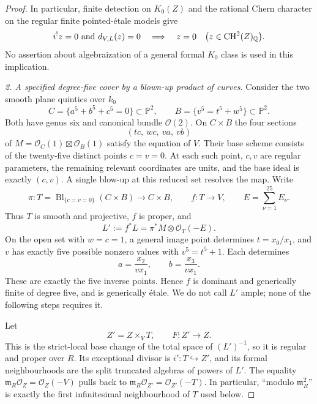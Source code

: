 \begin{proof}
In particular, finite detection on $K_0(Z)$ and the rational
Chern character on the regular finite pointed-\'etale models give
\begin{equation}\label{eq:C3au-detect}
 i^!z=0\ \hbox{and}\ d_{V,L}(z)=0
       \quad\Longrightarrow\quad z=0
           \quad\bigl(z\in\mathrm{CH}^2(Z)_{\mathbb Q}\bigr).
\end{equation}
No assertion about algebraization of a general formal $K_0$
class is used in this implication.

\emph{2. A specified degree-five cover by a blown-up product of curves.}
Consider the two smooth plane quintics over $k_0$
\[
 C=\{a^5+b^5+c^5=0\}\subset\mathbb P^2,
 \qquad
 B=\{v^5=t^5+w^5\}\subset\mathbb P^2.
\]
Both have genus six and canonical bundle $\mathcal O(2)$.
On $C\times B$ the four sections
\[
                  (tc,\ wc,\ va,\ vb)
\]
of $M=\mathcal O_C(1)\boxtimes\mathcal O_B(1)$ satisfy
the equation of $V$. Their base scheme consists of the twenty-five
distinct points $c=v=0$. At each such point, $c,v$ are regular
parameters, the remaining relevant coordinates are units, and the
base ideal is exactly $(c,v)$. A single blow-up at this reduced
set resolves the map. Write
\[
 \pi:T=\operatorname{Bl}_{\{c=v=0\}}(C\times B)\longrightarrow C\times B,
 \qquad f:T\longrightarrow V,
 \qquad E=\sum_{\nu=1}^{25}E_\nu.
\]
Thus $T$ is smooth and projective, $f$ is proper, and
\begin{equation}\label{eq:C3au-line}
             L':=f^*L=\pi^*M\otimes\mathcal O_T(-E).
\end{equation}
On the open set with $w=c=1$, a general image point determines
$t=x_0/x_1$, and $v$ has exactly five possible nonzero values
with $v^5=t^5+1$. Each determines
\[
                    a=\frac{x_2}{v x_1},\qquad
                    b=\frac{x_3}{v x_1}.
\]
These are exactly the five inverse points. Hence $f$ is dominant
and generically finite of degree five, and is generically \'etale.
We do not call $L'$ ample; none of the following steps requires it.

Let
\[
              Z'=Z\times_V T,\qquad F:Z'\longrightarrow Z.
\]
This is the strict-local base change of the total space of
$(L')^{-1}$, so it is regular and proper over $R$.
Its exceptional divisor is $i':T\hookrightarrow Z'$, and its
formal neighbourhoods are the split truncated algebras of powers
of $L'$. The equality $\mathfrak m_R\mathcal O_Z=\mathcal O_Z(-V)$
pulls back to
$\mathfrak m_R\mathcal O_{Z'}=\mathcal O_{Z'}(-T)$.
In particular, ``modulo $\mathfrak m_R^2$'' is exactly the first
infinitesimal neighbourhood of $T$ used below.


\end{proof}
